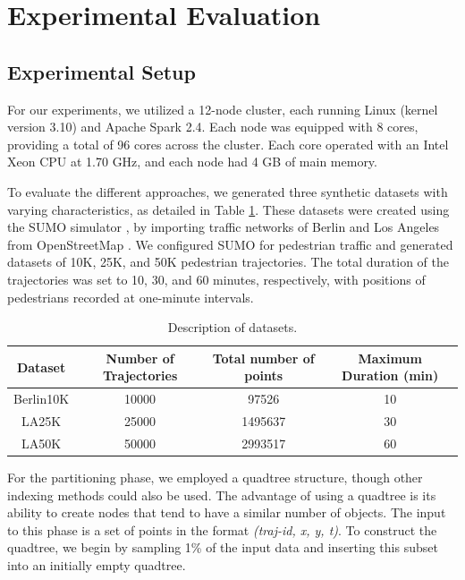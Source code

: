 \section{Experimental Evaluation}
\subsection{Experimental Setup}
For our experiments, we utilized a 12-node cluster, each running Linux (kernel version 3.10) and Apache Spark 2.4. Each node was equipped with 8 cores, providing a total of 96 cores across the cluster. Each core operated with an Intel Xeon CPU at 1.70 GHz, and each node had 4 GB of main memory.

To evaluate the different approaches, we generated three synthetic datasets with varying characteristics, as detailed in Table \ref{tab:datasets}. These 
datasets were created using the SUMO simulator \cite{krajzewicz_recent_2012}, by importing traffic networks of Berlin and Los Angeles from OpenStreetMap 
\cite{haklay2008openstreetmap}. We configured SUMO for pedestrian traffic and generated datasets of 10K, 25K, and 50K pedestrian trajectories. The total 
duration of the trajectories was set to 10, 30, and 60 minutes, respectively, with positions of pedestrians recorded at one-minute intervals.

\begin{table}
    \centering
    \caption{Description of datasets.}\label{tab:datasets}
    \begin{tabular}{cccc}
        \hline
        Dataset & Number of Trajectories & Total number of points & Maximum Duration (min) \\
        \hline
         Berlin10K &  10000 & 97526 & 10\\ 
         LA25K &  25000 & 1495637 & 30\\
         LA50K &  50000 & 2993517 & 60\\
         \hline
    \end{tabular}
\end{table}

For the partitioning phase, we employed a quadtree structure, though other indexing methods could also be used. The advantage of using a quadtree is its ability to create nodes that tend to have a similar number of objects. The input to this phase is a set of points in the format \textit{(traj-id, x, y, t)}. To construct the quadtree, we begin by sampling 1\% of the input data and inserting this subset into an initially empty quadtree.

